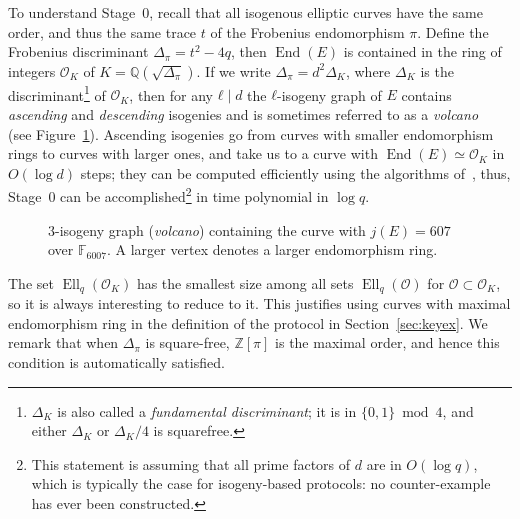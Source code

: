 \documentclass{llncs}
\newcommand{\F}{\mathbb{F}}
\renewcommand{\O}{\mathcal{O}}
\DeclareMathOperator{\End}{End}
\DeclareMathOperator{\Ell}{Ell}
\begin{document}
To understand Stage~0, recall that all isogenous elliptic curves have
the same order, and thus the same trace $t$ of the Frobenius
endomorphism $π$. Define the Frobenius discriminant $Δ_π=t^2-4q$, then
$\End(E)$ is contained in the ring of integers $\O_K$ of
$K=ℚ(\sqrt{Δ_π})$. If we write $Δ_π=d^2Δ_K$, where $Δ_K$ is the
discriminant\footnote{$Δ_K$ is also called a \emph{fundamental
    discriminant}; it is in $\{0,1\}\bmod 4$, and either $Δ_K$ or
  $Δ_K/4$ is squarefree.} of $\O_K$, then for any $ℓ\mid d$ the
$ℓ$-isogeny graph of $E$ contains \emph{ascending} and
\emph{descending} isogenies and is sometimes referred to as a
\emph{volcano}~\cite{fouquet+morain02} (see Figure~\ref{fig:volcano}).
Ascending isogenies go from curves with smaller endomorphism rings to
curves with larger ones, and take us to a curve with $\End(E)≃\O_K$ in
$O(\log d)$ steps; they can be computed efficiently using the
algorithms
of~\cite{kohel,fouquet+morain02,ionica+joux13,defeo2016explicit},
thus, Stage~0 can be accomplished\footnote{This statement is assuming
  that all prime factors of $d$ are in $O(\log q)$, which is typically
  the case for isogeny-based protocols: no counter-example
	has ever been constructed.}  in time polynomial in
$\log q$.

\begin{figure}
  \centering
  \caption{$3$-isogeny graph (\emph{volcano}) containing the curve
    with $j(E)=607$ over $\F_{6007}$. A larger vertex denotes a larger
    endomorphism ring.}
  \label{fig:volcano}
\end{figure}

The set $\Ell_q(\O_K)$ has the smallest size among all sets
$\Ell_q(\O)$ for $\O⊂\O_K$, so it is always interesting to
reduce to it. This justifies using curves with maximal endomorphism
ring in the definition of the protocol in
Section~\ref{sec:keyex}. We remark that when $Δ_π$ is square-free, $ℤ[π]$
is the maximal order, and hence this condition is automatically satisfied.
\end{document}
